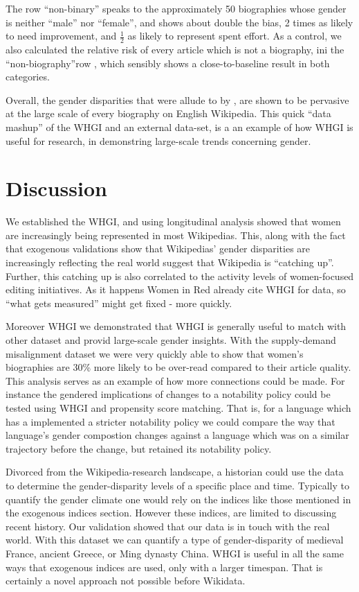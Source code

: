 \documentclass{sig-alternate-05-2015}
\begin{document}
The row ``non-binary'' speaks to the approximately 50 biographies whose gender is neither ``male'' nor ``female'', and shows about double the bias, 2 times as likely to need improvement, and $\frac{1}{2}$ as likely to represent spent effort. As a control, we also calculated the relative risk of every article which is not a biography, ini the ``non-biography''row , which sensibly shows a close-to-baseline result in both categories. 

Overall, the gender disparities that were allude to by  \cite{warncke-wang_misalignment_2015}, are shown to be pervasive at the large scale of every biography on English Wikipedia. This quick ``data mashup'' of the WHGI and an external data-set, is a an example of how WHGI is useful for research, in demonstring large-scale trends concerning gender.

   
\section{Discussion}
We established the WHGI, and using longitudinal analysis showed that women are increasingly being represented in most Wikipedias. This, along with the fact that exogenous validations show that Wikipedias' gender disparities are increasingly reflecting the real world suggest that Wikipedia is ``catching up''. Further, this catching up is also correlated to the activity levels of women-focused editing initiatives. As it happens Women in Red already cite WHGI for data, so ``what gets measured'' might get fixed - more quickly.

Moreover WHGI we demonstrated that WHGI is generally useful to match with other dataset and provid large-scale gender insights. With the supply-demand misalignment dataset we were very quickly able to show that women's biographies are 30\% more likely to be over-read compared to their article quality. This analysis serves as an example of how more connections could be made. For instance the gendered implications of changes to a notability policy could be tested using WHGI and propensity score matching. That is, for a language which has a implemented a stricter notability policy we could compare the way that language's gender compostion changes against a language which was on a similar trajectory before the change, but retained its notability policy.

Divorced from the Wikipedia-research landscape, a historian could use the data to determine the gender-disparity levels of a specific place and time. Typically to quantify the gender climate one would rely on the indices like those mentioned in the exogenous indices section. However these indices, are limited to discussing recent history. Our validation showed that our data is in touch with the real world. With this dataset we can quantify a type of gender-disparity of medieval France, ancient Greece, or Ming dynasty China. WHGI is useful in all the same ways that exogenous indices are used, only with a larger timespan. That is certainly a novel approach not possible before Wikidata.
\end{document}
